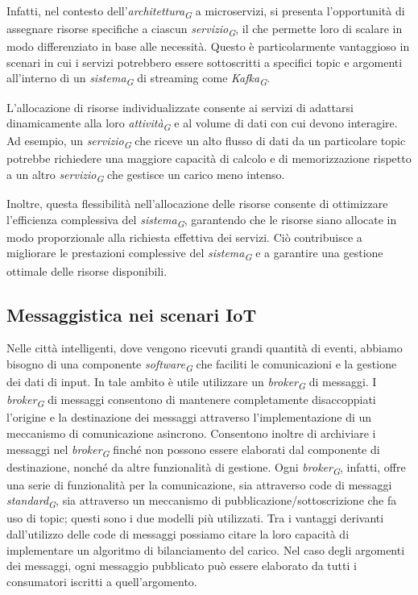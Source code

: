 Infatti, nel contesto dell'\textit{architettura}\textsubscript{\textit{G}} a microservizi, si presenta l'opportunità di assegnare risorse specifiche a ciascun \textit{servizio}\textsubscript{\textit{G}}, il che permette loro di scalare in modo differenziato in base alle necessità. Questo è particolarmente vantaggioso in scenari in cui i servizi potrebbero essere sottoscritti a specifici topic e argomenti all'interno di un \textit{sistema}\textsubscript{\textit{G}} di streaming come \textit{Kafka}\textsubscript{\textit{G}}.

L'allocazione di risorse individualizzate consente ai servizi di adattarsi dinamicamente alla loro \textit{attività}\textsubscript{\textit{G}} e al volume di dati con cui devono interagire. Ad esempio, un \textit{servizio}\textsubscript{\textit{G}} che riceve un alto flusso di dati da un particolare topic potrebbe richiedere una maggiore capacità di calcolo e di memorizzazione rispetto a un altro \textit{servizio}\textsubscript{\textit{G}} che gestisce un carico meno intenso.

Inoltre, questa flessibilità nell'allocazione delle risorse consente di ottimizzare l'efficienza complessiva del \textit{sistema}\textsubscript{\textit{G}}, garantendo che le risorse siano allocate in modo proporzionale alla richiesta effettiva dei servizi. Ciò contribuisce a migliorare le prestazioni complessive del \textit{sistema}\textsubscript{\textit{G}} e a garantire una gestione ottimale delle risorse disponibili.

\subsection{Messaggistica nei scenari IoT}
Nelle città intelligenti, dove vengono ricevuti grandi quantità di eventi, abbiamo bisogno di una componente \textit{software}\textsubscript{\textit{G}} che faciliti le comunicazioni e la gestione dei dati di input. In tale ambito è utile utilizzare un \textit{broker}\textsubscript{\textit{G}} di messaggi. I \textit{broker}\textsubscript{\textit{G}} di messaggi consentono di mantenere completamente disaccoppiati l'origine e la destinazione dei messaggi attraverso l'implementazione di un meccanismo di comunicazione asincrono. Consentono inoltre di archiviare i messaggi nel \textit{broker}\textsubscript{\textit{G}} finché non possono essere elaborati dal componente di destinazione, nonché da altre funzionalità di gestione. Ogni \textit{broker}\textsubscript{\textit{G}}, infatti, offre una serie di funzionalità per la comunicazione, sia attraverso code di messaggi \textit{standard}\textsubscript{\textit{G}}, sia attraverso un meccanismo di pubblicazione/sottoscrizione che fa uso di topic; questi sono i due modelli più utilizzati. Tra i vantaggi derivanti dall'utilizzo delle code di messaggi possiamo citare la loro capacità di implementare un algoritmo di bilanciamento del carico. Nel caso degli argomenti dei messaggi, ogni messaggio pubblicato può essere elaborato da tutti i consumatori iscritti a quell'argomento.

